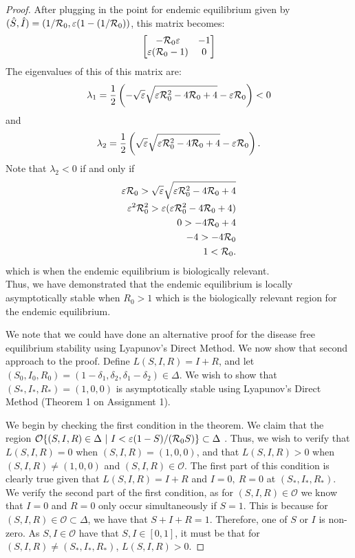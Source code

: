 \documentclass[12pt]{article}\usepackage[]{graphicx}\usepackage[]{color}
\begin{document}
\begin{enumerate}[(a)]
{\begin{proof}
{After plugging in the point for endemic equilibrium given by $(\hat{S},\hat{I})=(1/{\cal R}_0, \varepsilon(1-(1/{\cal R}_0))$, this matrix becomes:
\begin{equation}
\begin{bmatrix}
-{\cal R}_0\varepsilon & -1\\
\varepsilon({\cal R}_0-1) & 0
\end{bmatrix}
\end{equation}
The eigenvalues of this of this matrix are:
$$
\lambda_1 = \frac{1}{2} \left( - \sqrt{\varepsilon} \sqrt{\varepsilon{\cal R}_0^2 - 4 {\cal R}_0 + 4} - \varepsilon {\cal R}_0\right) < 0
$$
and
$$
\lambda_2 = \frac{1}{2}\left(\sqrt{\varepsilon} \sqrt{\varepsilon{\cal R}_0^2 - 4 {\cal R}_0 + 4} - \varepsilon {\cal R}_0\right).
$$
Note that $\lambda_2 < 0$ if and only if 
\begin{equation}
\begin{aligned}
\varepsilon {\cal R}_0 > \sqrt\varepsilon \sqrt{\varepsilon{\cal R}_0^2 - 4 {\cal R}_0 + 4} \\
\varepsilon^2 {\cal R}_0^2 > \varepsilon (\varepsilon {\cal R}_0^2 - 4{\cal R}_0 + 4)\\
0 > -4 {\cal R}_0 + 4\\
-4 > -4 {\cal R}_0\\
1 < {\cal R}_0.
\end{aligned}
\end{equation}
which is when the endemic equilibrium is biologically relevant. \\
Thus, we have demonstrated that the endemic equilibrium is locally asymptotically stable when $R_0>1$ which is the biologically relevant region for the endemic equilibrium.

We note that we could have done an alternative proof for the disease free equilibrium stability using Lyapunov's Direct Method. We now show that second approach to the proof. Define $L(S, I, R) = I+R$, and let $(S_0, I_0, R_0) = (1- \delta_1, \delta_2, \delta_1 - \delta_2) \in \Delta$. We wish to show that $(S_\ast, I_\ast, R_\ast) = (1, 0, 0)$ is asymptotically stable using Lyapunov's Direct Method (Theorem 1 on Assignment 1).

We begin by checking the first condition in the theorem. We claim that the region  $\mathcal{O} \{(S,I,R) \in \Delta \ | \ I< \varepsilon(1-S)/({\cal R}_0S)\} \subset \Delta$ . Thus, we wish to verify that $L(S,I,R)=0$ when $(S,I,R)=(1,0,0)$, and that $L(S,I,R)>0$ when $(S,I,R) \neq (1,0,0)$ and $(S,I,R) \in \mathcal{O}$. The first part of this condition is clearly true given that $L(S,I,R)=I+R$ and $I=0,\ R=0$ at $(S_\ast, I_\ast, R_\ast)$. We verify the second part of the first condition, as for $(S,I,R) \in \mathcal{O}$ we know that $I=0$ and $R=0$ only occur simultaneously if $S=1$. This is because for $(S,I,R) \in \mathcal{O} \subset \Delta$, we have that $S+I+R=1$. Therefore, one of $S$ or $I$ is non-zero. As $S,I \in \mathcal{O}$ have that $S,I \in [0,1]$, it must be that for $(S,I,R) \neq (S_\ast, I_\ast, R_\ast)$, $L(S,I,R)>0$. 

}
\end{proof}}
\end{enumerate}
\end{document}
